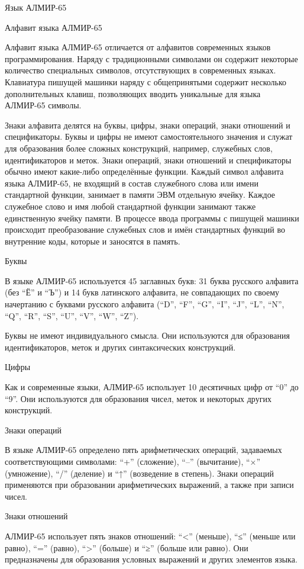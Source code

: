 \documentclass[11pt]{article}
\begin{document}
Язык АЛМИР-65

Алфавит языка АЛМИР-65

Алфавит языка АЛМИР-65 отличается от
алфавитов современных языков
программирования. Наряду с
традиционными символами он содержит
некоторые количество специальных
символов, отсутствующих в современных
языках. Клавиатура пишущей машинки
наряду с общепринятыми содержит
несколько дополнительных клавиш,
позволяющих вводить уникальные для
языка АЛМИР-65 символы.

Знаки алфавита делятся на буквы, цифры,
знаки операций, знаки отношений и
спецификаторы. Буквы и цифры не имеют
самостоятельного значения и служат для
образования более сложных конструкций,
например, служебных слов,
идентификаторов и меток. Знаки
операций, знаки отношений и
спецификаторы обычно имеют какие-либо
определённые функции. Каждый символ
алфавита языка АЛМИР-65, не входящий в
состав служебного слова или имени
стандартной функции, занимает в памяти
ЭВМ отдельную ячейку. Каждое служебное
слово и имя любой стандартной функции
занимают также единственную ячейку
памяти. В процессе ввода программы с
пишущей машинки происходит
преобразование служебных слов и имён
стандартных функций во внутренние
коды, которые и заносятся в память.

Буквы

В языке АЛМИР-65 используется 45
заглавных букв: 31 буква русского
алфавита (без “Ё” и “Ъ”) и 14 букв
латинского алфавита, не совпадающих по
своему начертанию с буквами русского
алфавита (“D”, “F”, “G”, “I”, “J”, “L”,
“N”, “Q”, “R”, “S”, “U”, “V”, “W”, “Z”).

Буквы не имеют индивидуального смысла.
Они используются для образования
идентификаторов, меток и других
синтаксических конструкций.

Цифры

Как и современные языки, АЛМИР-65
использует 10 десятичных цифр от “0” до
“9”. Они используются для образования
чисел, меток и некоторых других
конструкций.

Знаки операций

В языке АЛМИР-65 определено пять
арифметических операций, задаваемых
соответствующими символами: “+”
(сложение), “–” (вычитание), “×”
(умножение), “/” (деление) и “↑”
(возведение в степень). Знаки операций
применяются при образовании
арифметических выражений, а также при
записи чисел.

Знаки отношений

АЛМИР-65 использует пять знаков
отношений: “<” (меньше), “≤” (меньше
или равно), “=” (равно), “>” (больше) и
“≥” (больше или равно). Они
предназначены для образования
условных выражений и других элементов
языка.
\end{document}

